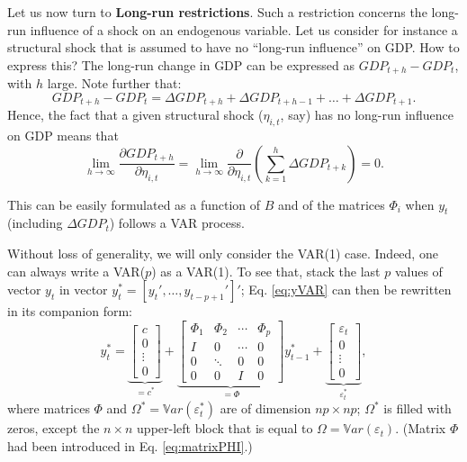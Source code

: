 \documentclass[
]{book}
\theoremstyle{definition}
\theoremstyle{definition}
\theoremstyle{definition}
\theoremstyle{definition}
\theoremstyle{remark}
\begin{document}
Let us now turn to \textbf{Long-run restrictions}. Such a restriction concerns the long-run influence of a shock on an endogenous variable. Let us consider for instance a structural shock that is assumed to have no ``long-run influence'' on GDP. How to express this? The long-run change in GDP can be expressed as \(GDP_{t+h} - GDP_t\), with \(h\) large. Note further that:
\[
GDP_{t+h} - GDP_t = \Delta GDP_{t+h} +\Delta GDP_{t+h-1} + \dots + \Delta GDP_{t+1}.
\]
Hence, the fact that a given structural shock (\(\eta_{i,t}\), say) has no long-run influence on GDP means that
\[
\lim_{h\rightarrow\infty}\frac{\partial GDP_{t+h}}{\partial \eta_{i,t}} = \lim_{h\rightarrow\infty} \frac{\partial}{\partial \eta_{i,t}}\left(\sum_{k=1}^h \Delta  GDP_{t+k}\right)= 0.
\]

This can be easily formulated as a function of \(B\) and of the matrices \(\Phi_i\) when \(y_t\) (including \(\Delta GDP_t\)) follows a VAR process.

Without loss of generality, we will only consider the VAR(1) case. Indeed, one can always write a VAR(\(p\)) as a VAR(1). To see that, stack the last \(p\) values of vector \(y_t\) in vector \(y_{t}^{*}=[y_t',\dots,y_{t-p+1}']'\); Eq. \eqref{eq:yVAR} can then be rewritten in its companion form:
\begin{equation}
y_{t}^{*} =
\underbrace{\left[\begin{array}{c}
c\\
0\\
\vdots\\
0\end{array}\right]}_{=c^*}+
\underbrace{\left[\begin{array}{cccc}
\Phi_{1} & \Phi_{2} & \cdots & \Phi_{p}\\
I & 0 & \cdots & 0\\
0 & \ddots & 0 & 0\\
0 & 0 & I & 0\end{array}\right]}_{=\Phi}
y_{t-1}^{*}+
\underbrace{\left[\begin{array}{c}
\varepsilon_{t}\\
0\\
\vdots\\
0\end{array}\right]}_{\varepsilon_t^*},\label{eq:ystarVAR}
\end{equation}
where matrices \(\Phi\) and \(\Omega^* = \mathbb{V}ar(\varepsilon_t^*)\) are of dimension \(np \times np\); \(\Omega^*\) is filled with zeros, except the \(n\times n\) upper-left block that is equal to \(\Omega = \mathbb{V}ar(\varepsilon_t)\). (Matrix \(\Phi\) had been introduced in Eq. \eqref{eq:matrixPHI}.)
\end{document}
